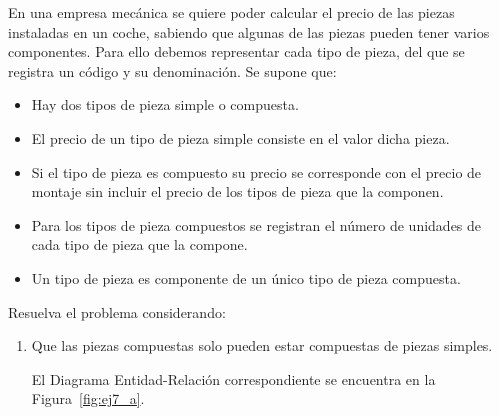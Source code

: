\begin{ejercicio} \label{ej:7}
    En una empresa mecánica se quiere poder calcular el precio de las piezas instaladas en un coche, sabiendo
    que algunas de las piezas pueden tener varios componentes. Para ello debemos representar cada tipo de
    pieza, del que se registra un código y su denominación. Se supone que:
    \begin{itemize}
        \item Hay dos tipos de pieza simple o compuesta.
        \item El precio de un tipo de pieza simple consiste en el valor dicha pieza.
        \item Si el tipo de pieza es compuesto su precio se corresponde con el precio de montaje sin incluir el precio de
        los tipos de pieza que la componen.
        \item Para los tipos de pieza compuestos se registran el número de unidades de cada tipo de pieza que la
        compone.
        \item Un tipo de pieza es componente de un único tipo de pieza compuesta.
    \end{itemize}
    Resuelva el problema considerando:
    \begin{enumerate}
        \item Que las piezas compuestas solo pueden estar compuestas de piezas simples.
        \label{ej:7_a}
        
        El Diagrama Entidad-Relación correspondiente se encuentra en la Figura~\ref{fig:ej7_a}.
        \begin{figure}
            \centering
\end{figure}
\end{enumerate}
\end{ejercicio}
